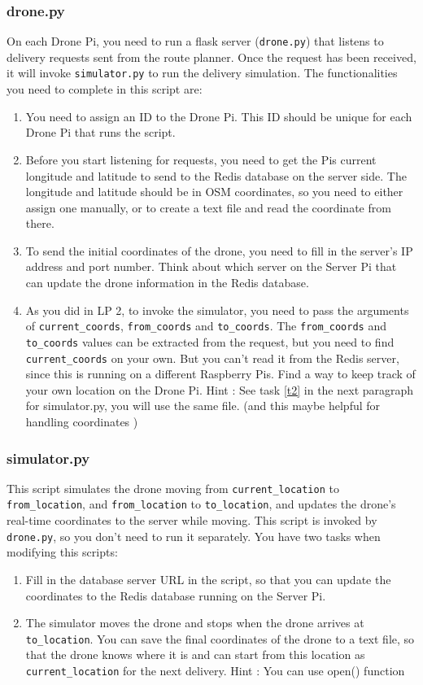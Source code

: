 \documentclass{article}
\begin{document}
\subsubsection{drone.py}
On each Drone Pi, you need to run a flask server (\verb!drone.py!) that listens to delivery requests sent from the route planner. Once the request has been received, it will invoke \verb!simulator.py! to run the delivery simulation. The functionalities you need to complete in this script are:
\begin{enumerate}
    \item You need to assign an ID to the Drone Pi. This ID should be unique for each Drone Pi that runs the script.
    \item Before you start listening for requests, you need to get the Pis current longitude and latitude to send to the Redis database on the server side. The longitude and latitude should be in OSM coordinates, so you need to either assign one manually, or to create a text file and read the coordinate from there.
    \item To send the initial coordinates of the drone, you need to fill in the server's IP address and port number. Think about which server on the Server Pi that can update the drone information in the Redis database.
    \item As you did in LP 2, to invoke the simulator, you need to pass the arguments of \verb!current_coords!, \verb!from_coords! and \verb!to_coords!. The \verb!from_coords! and \verb!to_coords! values can be extracted from the request, but you need to find \verb!current_coords! on your own. But you can't read it from the Redis server, since this is running on a different Raspberry Pis. Find a way to keep track of your own location on the Drone Pi. Hint : See task \ref{t2} in the next paragraph for simulator.py, you will use the same file. (and this maybe helpful for handling coordinates \cite{try})
\end{enumerate}

\subsubsection{simulator.py}
This script simulates the drone moving from \verb!current_location! to \verb!from_location!, and \verb!from_location! to \verb!to_location!, and updates the drone's real-time coordinates to the server while moving. This script is invoked by \verb!drone.py!, so you don't need to run it separately. You have two tasks when modifying this scripts:
\begin{enumerate}
    \item Fill in the database server URL in the script, so that you can update the coordinates to the Redis database running on the Server Pi.
    \item\label{t2} The simulator moves the drone and stops when the drone arrives at \verb!to_location!. You can save the final coordinates of the drone to a text file, so that the drone knows where it is and can start from this location as \verb!current_location! for the next delivery. Hint : You can use open() function \cite{open}
\end{enumerate}
\end{document}
